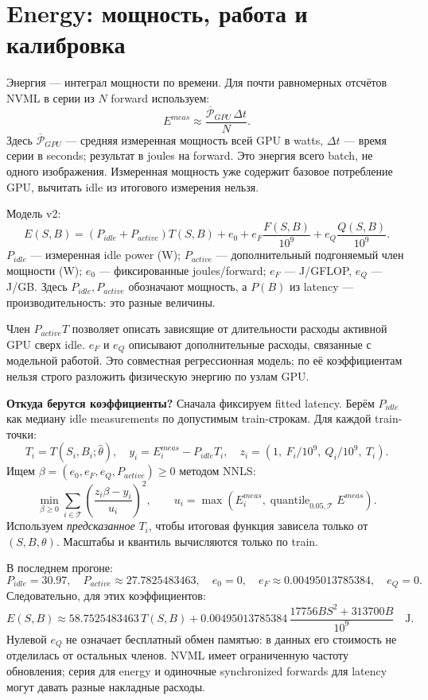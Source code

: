 \documentclass[11pt,a4paper]{article}
\newcommand{\page}[1]{\clearpage\section{#1}}
\begin{document}
\page{Energy: мощность, работа и калибровка}
Энергия --- интеграл мощности по времени. Для почти равномерных отсчётов
NVML в серии из $N$ forward используем:
\[
 E^{meas}\approx\frac{\overline{\mathcal P}_{GPU}\,\Delta t}{N}.
\]
Здесь $\overline{\mathcal P}_{GPU}$ --- средняя измеренная мощность всей GPU
в watts, $\Delta t$ --- время серии в seconds; результат в joules на forward.
Это энергия всего batch, не одного изображения. Измеренная мощность уже
содержит базовое потребление GPU, вычитать idle из итогового измерения нельзя.

Модель v2:
\[
\boxed{E(S,B)=(P_{idle}+P_{active})T(S,B)
 +e_0+e_F\frac{F(S,B)}{10^9}+e_Q\frac{Q(S,B)}{10^9}.}
\]
$P_{idle}$ --- измеренная idle power (W); $P_{active}$ --- дополнительный
подгоняемый член мощности (W); $e_0$ --- фиксированные joules/forward;
$e_F$ --- J/GFLOP, $e_Q$ --- J/GB. Здесь $P_{idle},P_{active}$ обозначают
мощность, а $P(B)$ из latency --- производительность: это разные величины.

Член $P_{active}T$ позволяет описать зависящие от длительности расходы
активной GPU сверх idle. $e_F$ и $e_Q$ описывают дополнительные расходы,
связанные с модельной работой. Это совместная регрессионная модель;
по её коэффициентам нельзя строго разложить физическую энергию по узлам GPU.

\textbf{Откуда берутся коэффициенты?} Сначала фиксируем fitted latency.
Берём $P_{idle}$ как медиану idle measurements по допустимым train-строкам.
Для каждой train-точки:
\[
 T_i=T(S_i,B_i;\widehat\theta),\quad
 y_i=E_i^{meas}-P_{idle}T_i,\quad
 z_i=(1,\ F_i/10^9,\ Q_i/10^9,\ T_i).
\]
Ищем $\beta=(e_0,e_F,e_Q,P_{active})\ge0$ методом NNLS:
\[
 \min_{\beta\ge0}\sum_{i\in\mathcal T}
 \left(\frac{z_i\beta-y_i}{u_i}\right)^2,\qquad
 u_i=\max(E_i^{meas},\operatorname{quantile}_{0.05,\mathcal T}E^{meas}).
\]
Используем \emph{предсказанное} $T_i$, чтобы итоговая функция зависела
только от $(S,B,\theta)$. Масштабы и квантиль вычисляются только по train.

В последнем прогоне:
\[
 P_{idle}=30.97,\quad P_{active}\approx27.7825483463,\quad
 e_0=0,\quad e_F\approx0.00495013785384,\quad e_Q=0.
\]
Следовательно, для этих коэффициентов:
\[
 \boxed{E(S,B)\approx58.7525483463\,T(S,B)
 +0.00495013785384\,\frac{17756BS^2+313700B}{10^9}\quad\text{J}.}
\]
Нулевой $e_Q$ не означает бесплатный обмен памятью: в данных его стоимость
не отделилась от остальных членов. NVML имеет ограниченную частоту обновления;
серия для energy и одиночные synchronized forwards для latency могут давать
разные накладные расходы.
\end{document}
